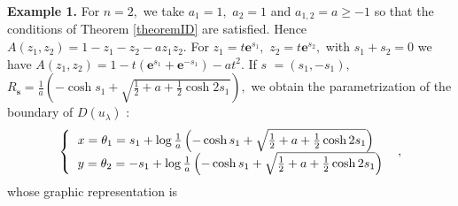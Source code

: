 \documentclass[a4paper,oneside,notitlepage]{article}%
\begin{document}
\textbf{Example 1. }For $n=2,$ we take $a_{1}=1,$ $a_{2}=1$ and $a_{1,2}%
=a\geqslant-1$ so that the conditions of Theorem \ref{theoremID} are
satisfied. Hence $A\left(  z_{1},z_{2}\right)  =1-z_{1}-z_{2}-az_{1}z_{2}.$
For $z_{1}=t\mathbf{e}^{s_{1}},$ $z_{2}=t\mathbf{e}^{s_{2}},$ with
$s_{1}+s_{2}=0$ we have $A\left(  z_{1},z_{2}\right)  =1-t\left(
\mathbf{e}^{s_{1}}+\mathbf{e}^{-s_{1}}\right)  -at^{2}.$ If \textbf{$s$%
}$=\left(  s_{1},-s_{1}\right)  ,$ $R_{\mathbf{s}}=\frac{1}{a}\left(  -\cosh
s_{1}+\sqrt{\frac{1}{2}+a+\frac{1}{2}\cosh2s_{1}}\right)  ,$ we obtain the
parametrization of the boundary of $D\left(  u_{\lambda}\right)  $ :
\[
\left\{
\begin{tabular}
[c]{l}%
$x=\theta_{1}=s_{1}+\log\frac{1}{a}\left(  -\cosh s_{1}+\sqrt{\frac{1}%
{2}+a+\frac{1}{2}\cosh2s_{1}}\right)  $\\
$y=\theta_{2}=-s_{1}+\log\frac{1}{a}\left(  -\cosh s_{1}+\sqrt{\frac{1}%
{2}+a+\frac{1}{2}\cosh2s_{1}}\right)  $%
\end{tabular}
\ \right.  ,
\]
whose graphic representation is%
\end{document}
